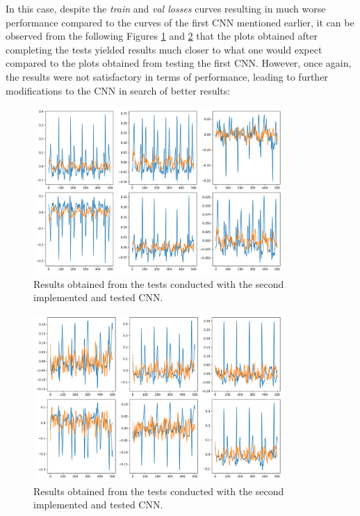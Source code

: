 \documentclass[12pt,english]{report}
\begin{document}
In this case, despite the \textit{train} and \textit{val losses} curves resulting in much worse performance compared to the curves of the first CNN mentioned earlier, it can be observed from the following Figures \ref{fig:second_cnn_second_plot_0} and \ref{fig:second_cnn_second_plot_1} that the plots obtained after completing the tests yielded results much closer to what one would expect compared to the plots obtained from testing the first CNN. However, once again, the results were not satisfactory in terms of performance, leading to further modifications to the CNN in search of better results:

\begin{figure}[H]
    \centering
    \includegraphics[width=0.85\textwidth]{images/second_cnn_second_plot_0.png}
    \captionsetup{justification=centering}
    \caption{Results obtained from the tests conducted with the second implemented and tested CNN.}
    \label{fig:second_cnn_second_plot_0}
\end{figure}
\begin{figure}[H]
    \centering
    \includegraphics[width=0.85\textwidth]{images/second_cnn_second_plot_1.png}
    \captionsetup{justification=centering}
    \caption{Results obtained from the tests conducted with the second implemented and tested CNN.}
    \label{fig:second_cnn_second_plot_1}
\end{figure}
\end{document}
